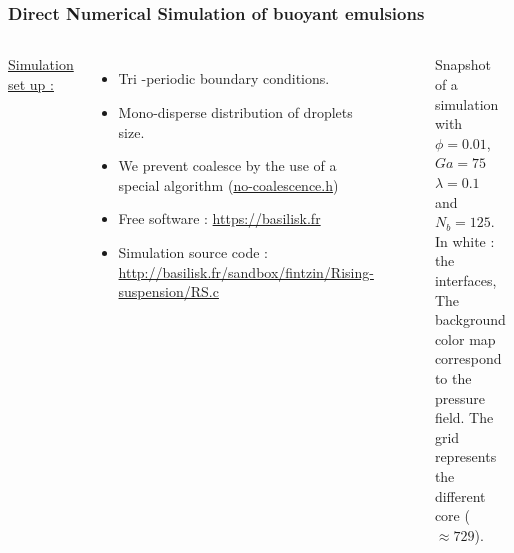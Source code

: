 \documentclass{sintefbeamer}
\begin{document}
\section*{}
\begin{frame}
\frametitle{Direct Numerical Simulation of buoyant emulsions}
\begin{columns}
\underline{Simulation set up :} 
\begin{itemize}
  \item Tri -periodic boundary conditions. 
  \item Mono-disperse distribution of droplets size.
  \item We prevent coalesce by the use of a special algorithm 
  (\href{http://basilisk.fr/sandbox/fintzin/Rising-Suspension/no-coalescence.h}{no-coalescence.h})
  \item Free software : \url{https://basilisk.fr}
  \item Simulation source code : \url{http://basilisk.fr/sandbox/fintzin/Rising-suspension/RS.c}
\end{itemize}

\begin{figure}
  \caption{Snapshot of a simulation with $\phi = 0.01$, $Ga = 75$ $\lambda = 0.1$ and $N_b = 125$. In white : the interfaces, The background color map correspond to the pressure field. The grid represents the different core ($\approx 729$).
  }
\end{figure}
\centering
\href{file:///work/fintzin/BUBLLES_PROJECT/movies/cut.gif}{}
\includegraphics[width =  1.1\textwidth]{image/PHI_01_Ga_75.png}
\end{columns}
\end{frame}
\end{document}

